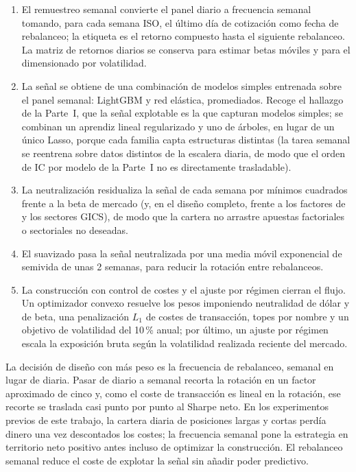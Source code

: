 \begin{enumerate}
  \item El remuestreo semanal convierte el panel diario a frecuencia semanal tomando, para
  cada semana ISO, el último día de cotización como fecha de rebalanceo; la etiqueta es el
  retorno compuesto hasta el siguiente rebalanceo. La matriz de retornos diarios se
  conserva para estimar betas móviles y para el dimensionado por volatilidad.
  \item La señal se obtiene de una combinación de modelos simples entrenada sobre el panel
  semanal: LightGBM y red elástica, promediados. Recoge el hallazgo de la Parte~I, que la
  señal explotable es la que capturan modelos simples; se combinan un aprendiz lineal
  regularizado y uno de árboles, en lugar de un único Lasso, porque cada familia capta
  estructuras distintas (la tarea semanal se reentrena sobre datos distintos de la escalera diaria, de
  modo que el orden de IC por modelo de la Parte~I no es directamente trasladable).
  \item La neutralización residualiza la señal de cada semana por mínimos cuadrados frente
  a la beta de mercado (y, en el diseño completo, frente a los factores de
  \textcite{famafrench2015five} y los sectores GICS), de modo que la cartera no arrastre
  apuestas factoriales o sectoriales no deseadas.
  \item El suavizado pasa la señal neutralizada por una media móvil exponencial de
  semivida de unas 2 semanas, para reducir la rotación entre rebalanceos.
  \item La construcción con control de costes y el ajuste por régimen cierran el flujo. Un
  optimizador convexo resuelve los pesos imponiendo neutralidad de dólar y de beta, una
  penalización $L_1$ de costes de transacción, topes por nombre y un objetivo de
  volatilidad del 10\,\% anual; por último, un ajuste por régimen escala la exposición
  bruta según la volatilidad realizada reciente del mercado.
\end{enumerate}

La decisión de diseño con más peso es la frecuencia de rebalanceo, semanal en lugar de
diaria. Pasar de diario a semanal recorta la rotación en un factor aproximado de cinco y,
como el coste de transacción es lineal en la rotación, ese recorte se traslada casi punto
por punto al Sharpe neto. En los experimentos previos de este trabajo, la cartera diaria
de posiciones largas y cortas perdía dinero una vez descontados los costes; la frecuencia
semanal pone la estrategia en territorio neto positivo antes incluso de optimizar la
construcción. El rebalanceo semanal reduce el coste de explotar la señal sin añadir poder predictivo.

